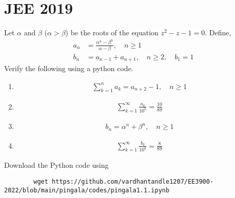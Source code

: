 \documentclass[journal,12pt,twocolumn]{IEEEtran}
\renewcommand\thesection{\arabic{section}}
\begin{document}
	\section{JEE 2019}
	\noindent Let $\alpha$ and $\beta$ ($\alpha > \beta$) be the roots of the
	equation $z^2 - z - 1 = 0$. Define,
	\begin{align}
		a_n &= \frac{\alpha^{n}-\beta^{n}}{\alpha - \beta}, \quad n \ge 1
		\\
		b_n &= a_{n-1} + a_{n+1}, \quad n \ge 2, \quad b_1 =1
		\label{eq:10-orig-diff}
	\end{align}
	Verify the following using a python code.
	\begin{enumerate}[label=\thesection.\arabic*
		,ref=\thesection.\theenumi]
		\item 
		\begin{align}
			\sum_{k=1}^{n}a_k = a_{n+2}-1, \quad n \ge 1
		\end{align}
		\item 
		\begin{align}
			\sum_{k=1}^{\infty}\frac{a_k}{10^k} =\frac{10}{89}
		\end{align}
		\item 
		\begin{align}
			b_n =\alpha^n + \beta^n, \quad n \ge 1
		\end{align}
		\item 
		\begin{align}
			\sum_{k=1}^{\infty}\frac{b_k}{10^k} =\frac{8}{89}
		\end{align}
	\end{enumerate}
	Download the Python code using
	\begin{lstlisting}
		wget https://github.com/vardhantandle1207/EE3900-2022/blob/main/pingala/codes/pingala1.1.ipynb
	\end{lstlisting}
\end{document}
